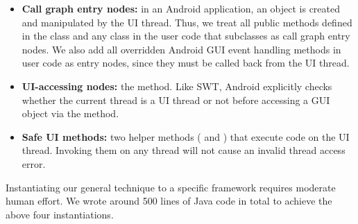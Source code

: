 \begin{itemize}

\item \textbf{Call graph entry nodes: }in an Android application,
an  object is created and manipulated by the UI thread. Thus, we treat
all public methods defined in the  class 
and any class in the user code that subclasses  as call graph entry nodes.
We also add all overridden Android GUI event handling methods in user
code as entry nodes, since they must be called back from the UI thread.

\item \textbf{UI-accessing nodes: }the  method.
Like SWT, Android explicitly checks whether
the current thread is a UI thread or not before accessing a GUI object via
the  method.

\item \textbf{Safe UI methods: } two helper methods (
and ) that execute code on the UI thread. 
Invoking them on any thread will not cause an invalid thread access error.

\end{itemize}


Instantiating our general technique to  a specific framework
requires moderate human effort. We wrote around 500 lines of Java code in total to achieve
the above four instantiations.
